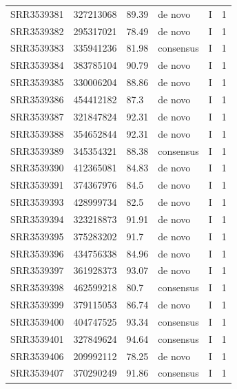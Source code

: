 \begin{longtable}{@{}llllll@{}}
SRR3539381 & 327213068     & 89.39       & de novo      & I        & 1        \\
SRR3539382 & 295317021     & 78.49       & de novo      & I        & 1        \\
SRR3539383 & 335941236     & 81.98       & consensus    & I        & 1        \\
SRR3539384 & 383785104     & 90.79       & de novo      & I        & 1        \\
SRR3539385 & 330006204     & 88.86       & de novo      & I        & 1        \\
SRR3539386 & 454412182     & 87.3        & de novo      & I        & 1        \\
SRR3539387 & 321847824     & 92.31       & de novo      & I        & 1        \\
SRR3539388 & 354652844     & 92.31       & de novo      & I        & 1        \\
SRR3539389 & 345354321     & 88.38       & consensus    & I        & 1        \\
SRR3539390 & 412365081     & 84.83       & de novo      & I        & 1        \\
SRR3539391 & 374367976     & 84.5        & de novo      & I        & 1        \\
SRR3539393 & 428999734     & 82.5        & de novo      & I        & 1        \\
SRR3539394 & 323218873     & 91.91       & de novo      & I        & 1        \\
SRR3539395 & 375283202     & 91.7        & de novo      & I        & 1        \\
SRR3539396 & 434756338     & 84.96       & de novo      & I        & 1        \\
SRR3539397 & 361928373     & 93.07       & de novo      & I        & 1        \\
SRR3539398 & 462599218     & 80.7        & consensus    & I        & 1        \\
SRR3539399 & 379115053     & 86.74       & de novo      & I        & 1        \\
SRR3539400 & 404747525     & 93.34       & consensus    & I        & 1        \\
SRR3539401 & 327849624     & 94.64       & consensus    & I        & 1        \\
SRR3539406 & 209992112     & 78.25       & de novo      & I        & 1        \\
SRR3539407 & 370290249     & 91.86       & consensus    & I        & 1        \\

\end{longtable}
